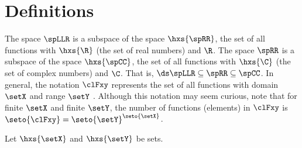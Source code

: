 \section{Definitions}
The space $\spLLR$ is a subspace of the space $\hxs{\spRR}$, the set of all functions with 
$\hxs{\R}$ (the set of real numbers) and  $\R$.
The space $\spRR$ is a subspace of the space $\hxs{\spCC}$, the set of all functions with 
$\hxs{\C}$ (the set of complex numbers) and  $\C$.
That is,
$\ds\spLLR \subseteq \spRR \subseteq \spCC$.
In general, the notation $\clFxy$ represents the set of all functions with domain $\setX$ and range $\setY$ .
Although this notation may seem curious, note that for finite $\setX$ and finite $\setY$, the number of functions (elements)
in $\clFxy$ is $\seto{\clFxy}=\seto{\setY}^\seto{\setX}$.
\begin{definition}
\label{def:spXY}
Let $\hxs{\setX}$ and $\hxs{\setY}$ be sets.
\end{definition}



